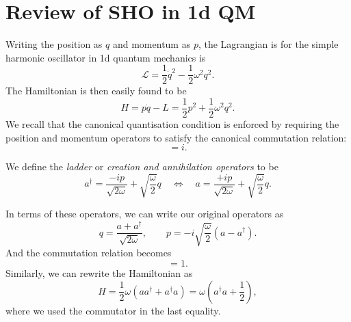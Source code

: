 \section{Review of SHO in 1d QM}%
\label{sec:review_of_sho_in_1d_qm}

Writing the position as $q$ and momentum as $p$, the Lagrangian is for the simple harmonic oscillator in 1d quantum mechanics is
\begin{equation}
  \mathcal{L} = \frac{1}{2}\dot q^2 - \frac{1}{2} \omega^2 q^2.
\end{equation}
The Hamiltonian is then easily found to be
\begin{equation}
  H = p \dot q - L = \frac{1}{2}p^2 + \frac{1}{2} \omega^2 q^2.
\end{equation}
We recall that the canonical quantisation condition is enforced by requiring the position and momentum operators to satisfy the canonical commutation relation:
\begin{equation}
  [q, p] = i.
\end{equation}


\begin{definition}[]
  We define the \emph{ladder} or \emph{creation and annihilation operators} to be
  \begin{equation}
    a^\dagger = \frac{-i p}{\sqrt{2 \omega}} + \sqrt{\frac{\omega}{2}} q \quad \iff \quad a = \frac{+ip}{\sqrt{2\omega}} + \sqrt{\frac{\omega}{2}}q.
  \end{equation}
\end{definition}

In terms of these operators, we can write our original operators as
\begin{equation}
  q = \frac{a + a^\dagger}{\sqrt{2 \omega}}, \qquad p = -i \sqrt{\frac{\omega}{2}} (a - a^\dagger).
\end{equation}
And the commutation relation becomes 
\begin{equation}
  [a, a^\dagger] = 1.
\end{equation}
Similarly, we can rewrite the Hamiltonian as
\begin{equation}
  H = \frac{1}{2} \omega (a a^\dagger + a^\dagger a) = \omega(a^\dagger a + \frac{1}{2}),
\end{equation}
where we used the commutator in the last equality.


